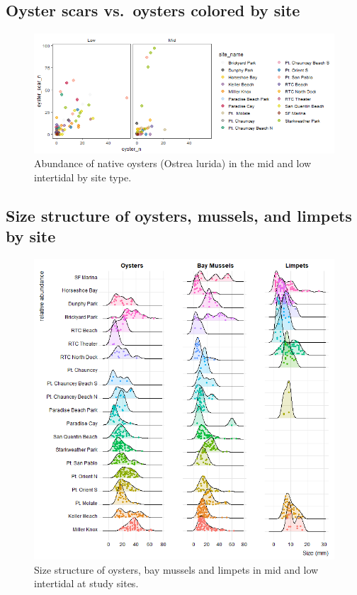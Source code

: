 \documentclass[
]{article}
\begin{document}
\hypertarget{oyster-scars-vs.-oysters-colored-by-site}{%
\subsection{Oyster scars vs.~oysters colored by site}\label{oyster-scars-vs.-oysters-colored-by-site}}

\begin{figure}

\includegraphics{sfb_quadrats_files/figure-latex/oyster-scar-plot-1} \hfill{}

\caption{ Abundance of native oysters (Ostrea lurida) in the mid and low intertidal by site type.}\label{fig:oyster-scar-plot}
\end{figure}

\hypertarget{size-structure-of-oysters-mussels-and-limpets-by-site}{%
\subsection{Size structure of oysters, mussels, and limpets by site}\label{size-structure-of-oysters-mussels-and-limpets-by-site}}

\begin{figure}

\includegraphics{sfb_quadrats_files/figure-latex/size-structure-plot-1} \hfill{}

\caption{ Size structure of oysters, bay mussels and limpets in mid and low intertidal at study sites.}\label{fig:size-structure-plot}
\end{figure}
\end{document}
